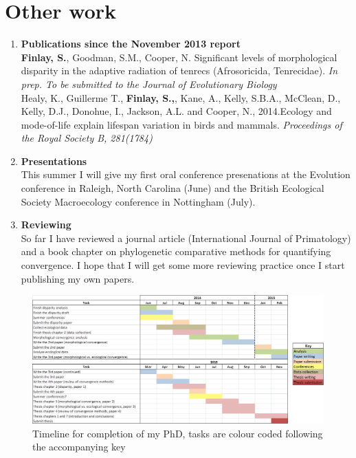 \documentclass[12pt,a4paper]{article}
\begin{document}
\section{Other work}
\begin{enumerate}

\item \textbf{Publications since the November 2013 report}\\
\textbf{Finlay, S.}, Goodman, S.M., Cooper, N. Significant levels of morphological disparity in the adaptive radiation of tenrecs (Afrosoricida, Tenrecidae). \textit{In prep. To be submitted to the Journal of Evolutionary Biology}\\
\bigskip %
Healy, K., Guillerme T., \textbf{Finlay, S.,}, Kane, A., Kelly, S.B.A., McClean, D., Kelly, D.J., Donohue, I., Jackson, A.L. and Cooper, N., 2014.Ecology and mode-of-life explain lifespan variation in birds and mammals. \textit{Proceedings of the Royal Society B, 281(1784)} 

\item \textbf{Presentations}\\
This summer I will give my first oral conference presenations at the Evolution conference in Raleigh, North Carolina (June) and the British Ecological Society Macroecology conference in Nottingham (July).

\item \textbf{Reviewing}\\

So far I have reviewed a journal article (International Journal of Primatology) and a book chapter on phylogenetic comparative methods for quantifying convergence. I hope that I will get some more reviewing practice once I start publishing my own papers.



\end{enumerate}


\begin{landscape}
\begin{figure}[p]
\centering
\includegraphics[keepaspectratio=true]{Gannt+key.png}
\caption{Timeline for completion of my PhD, tasks are colour coded following the accompanying key}
\label{gannt}
\end{figure}
\end{landscape}




\end{document}
